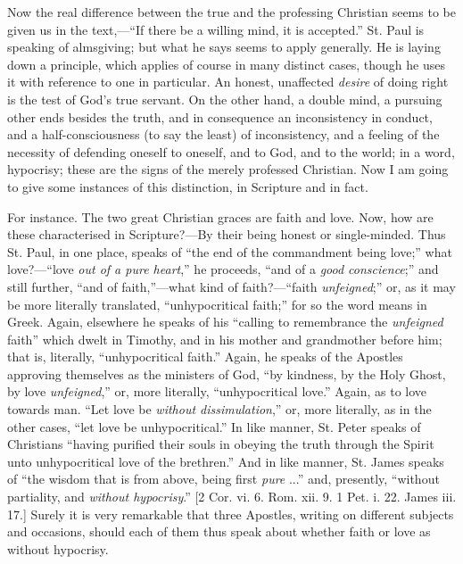 Now the real difference between the true and the professing
Christian seems to be given us in the text,—``If there be a
willing mind, it is accepted.'' St. Paul is speaking of almsgiving;
but what he says seems to apply generally. He is laying down a
principle, which applies of course in many distinct cases, though he
uses it with reference to one in particular. An honest, unaffected \emph{desire}
of doing right is the test of God's true servant. On the other hand, a
double mind, a pursuing other ends besides the truth, and in
consequence an inconsistency in conduct, and a half-consciousness (to
say the least) of inconsistency, and a feeling of the necessity of
defending oneself to oneself, and to God, and to the world; in a word,
hypocrisy; these are the signs of the merely professed Christian. Now
I am going to give some instances of this distinction, in Scripture
and in fact.

For instance. The two great Christian graces are faith and love.
Now, how are these characterised in Scripture?—By their being honest
or single-minded. Thus St. Paul, in one place, speaks of ``the end
of the commandment being love;'' what love?—``love \emph{out of
a pure heart},'' he proceeds, ``and of a \emph{good conscience};''
and still further, ``and of faith,''—what kind of faith?—``faith \emph{unfeigned};'' or, as it may be more
literally translated, ``unhypocritical faith;'' for so the
word means in Greek. Again, elsewhere he speaks of his ``calling
to remembrance the \emph{unfeigned} faith'' which dwelt in
Timothy, and in his mother and grandmother before him; that is,
literally, ``unhypocritical faith.'' Again, he speaks of the
Apostles approving themselves as the ministers of God, ``by
kindness, by the Holy Ghost, by love \emph{unfeigned},'' or, more
literally, ``unhypocritical love.'' Again, as to love towards
man. ``Let love be \emph{without dissimulation},'' or, more
literally, as in the other cases, ``let love be unhypocritical.''
In like manner, St. Peter speaks of Christians ``having purified
their souls in obeying the truth through the Spirit unto
unhypocritical love of the brethren.'' And in like manner, St.
James speaks of ``the wisdom that is from above, being first \emph{pure}
...'' and, presently, ``without partiality, and \emph{without
hypocrisy}.'' [2 Cor. vi. 6. Rom. xii. 9. 1 Pet. i. 22. James
iii. 17.] Surely it is very remarkable that three Apostles, writing on
different subjects and occasions, should each of them thus speak about
whether faith or love as without hypocrisy.

